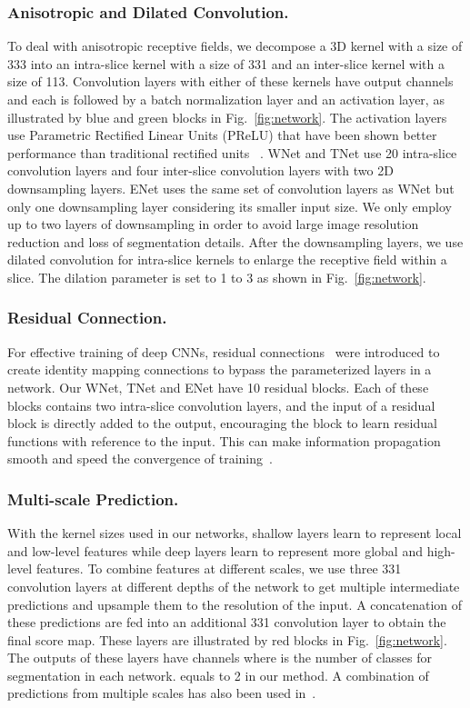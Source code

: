\documentclass[a4paper,orivec,runningheads]{llncs}
\begin{document}
\subsubsection{Anisotropic and Dilated Convolution.}
To deal with anisotropic receptive fields, we decompose a 3D kernel with a size of 333 into an intra-slice kernel with a size of 331 and an inter-slice kernel with a size of  113. Convolution layers with either of these kernels have  output channels and each is followed by a batch normalization layer and an activation layer, as illustrated by blue and green blocks in Fig.~\ref{fig:network}. The activation layers use Parametric Rectified Linear Units (PReLU) that have been shown better performance than traditional rectified units~\cite{He2015iccv} .  WNet and TNet use 20 intra-slice convolution layers and four inter-slice convolution layers with two 2D downsampling layers. ENet uses the same set of convolution layers as WNet but only one downsampling layer considering its smaller input size. We only employ up to two layers of downsampling in order to avoid large image resolution reduction and loss of segmentation details. After the downsampling layers, we use dilated convolution for intra-slice kernels to enlarge the receptive field within a slice. The dilation parameter is set to 1 to 3 as shown in Fig.~\ref{fig:network}. 

\subsubsection{Residual Connection.} For effective training of deep CNNs, residual connections~\cite{He2015res} were introduced to create identity mapping connections to bypass the parameterized layers in a network. Our WNet, TNet and ENet have 10 residual blocks. Each of these blocks contains two intra-slice convolution layers, and the input of a residual block is directly added to the output, encouraging the block to learn residual functions with reference to the input. This can make information propagation smooth and speed the convergence of training~\cite{He2015res,Li2017}.

\subsubsection{Multi-scale Prediction.}  With the kernel sizes used in our networks, shallow layers learn to represent local and low-level features while deep layers learn to represent more global and high-level features. To combine features at different scales, we use three 331 convolution layers at different depths of the network to get multiple intermediate predictions and upsample them to the resolution of the input. A concatenation of these predictions are fed into an additional 331 convolution layer to obtain the final score map. These layers are illustrated by red blocks in Fig.~\ref{fig:network}. The outputs of these layers have  channels where  is the number of classes for segmentation in each network.  equals to 2 in our method. A combination of predictions from multiple scales has also been used in~\cite{Xie2015,Fidon2017b}. 
\end{document}
